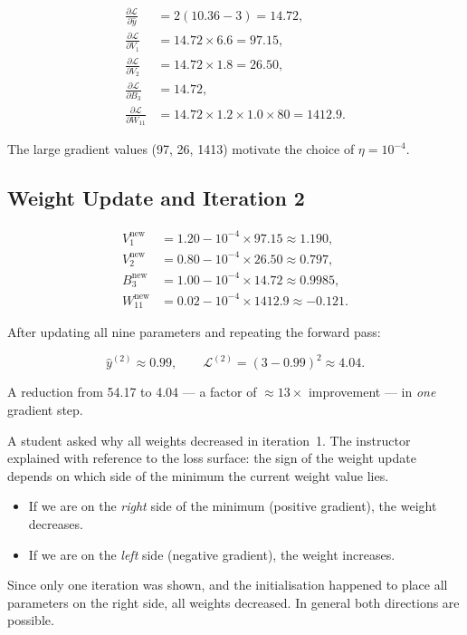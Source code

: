 \documentclass[12pt,a4paper]{article}
\newcommand{\pd}[2]{\frac{\partial #1}{\partial #2}}
\begin{document}
\begin{align}
  \pd{\mathcal{L}}{\hat{y}} &= 2(10.36 - 3) = 14.72,\\
  \pd{\mathcal{L}}{V_1} &= 14.72\times 6.6 = 97.15,\\
  \pd{\mathcal{L}}{V_2} &= 14.72\times 1.8 = 26.50,\\
  \pd{\mathcal{L}}{B_3} &= 14.72,\\
  \pd{\mathcal{L}}{W_{11}} &= 14.72\times1.2\times1.0\times80 = 1412.9.
\end{align}

The large gradient values (97, 26, 1413) motivate the choice of
$\eta = 10^{-4}$.

\subsection{Weight Update and Iteration 2}

\begin{align}
  V_1^{\mathrm{new}} &= 1.20 - 10^{-4}\times97.15 \approx 1.190,\\
  V_2^{\mathrm{new}} &= 0.80 - 10^{-4}\times26.50 \approx 0.797,\\
  B_3^{\mathrm{new}} &= 1.00 - 10^{-4}\times14.72 \approx 0.9985,\\
  W_{11}^{\mathrm{new}} &= 0.02 - 10^{-4}\times1412.9 \approx -0.121.
\end{align}

After updating all nine parameters and repeating the forward pass:

\begin{equation}
  \hat{y}^{(2)} \approx 0.99,\qquad
  \mathcal{L}^{(2)} = (3 - 0.99)^{2} \approx 4.04.
\end{equation}

A reduction from 54.17 to 4.04 --- a factor of $\approx\!13\times$ improvement
--- in \emph{one} gradient step.

\begin{example}[title=Interpreting Weight Direction Change]
A student asked why all weights decreased in iteration~1.  The instructor
explained with reference to the loss surface: the sign of the weight update
depends on which side of the minimum the current weight value lies.
\begin{itemize}[noitemsep]
  \item If we are on the \emph{right} side of the minimum (positive gradient),
        the weight decreases.
  \item If we are on the \emph{left} side (negative gradient), the weight
        increases.
\end{itemize}
Since only one iteration was shown, and the initialisation happened to place
all parameters on the right side, all weights decreased.  In general both
directions are possible.
\end{example}
\end{document}
